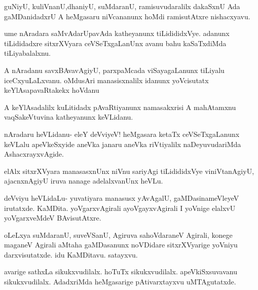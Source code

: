 \documentclass{article}
\begin{document}
\begin{mng}%
guNiyU, kuliVnanU,dhaniyU, suMdaranU, ramisuvudaralilx
dakaSxnU Ada gaMDanidadxrU A heMgasaru niVcananunx hoMdi ramisutAtxre
nishacxyavu.
\end{mng}

\begin{mng}%
ume nAradara saMvAdarUpavAda katheyanunx tiLidididxVye.
adanunx tiLididadxre sitxrXVyara ceVSeTxgaLanUnx avanu bahu kaSaTxdiMda tiLiyabalalxnu.
\end{mng}

\begin{mng}%
A nAradanu savxBAvavAgiyU, parxpaMcada viSayagaLanunx tiLiyalu
iceCxyuLaLxvanu. oMdusAri manasisxnalilx idanunx yoVcisutatx
keYlAsapavaRtakekx hoVdanu
\end{mng}

\begin{mng}%
A keYlAsadalilx kuLitidadx pAvaRtiyanunx namasakxrisi A mahAtamxnu
vaqSakeVtuvina katheyanunx keVLidanu.
\end{mng}

\begin{mng}%
nAradaru heVLidanu- eleY deVviyeV! heMgasara ketaTx ceVSeTxgaLanunx
keVLalu apeVkeSxyide aneVka janaru aneVka riVtiyalilx naDeyuvudariMda 
AshacxrayxvAgide.
\end{mng}

\begin{mng}%
elAlx sitxrXVyara manasasxnUnx niVnu sariyAgi tiLidididxVye
viniVtanAgiyU, ajacnxnAgiyU iruva nanage adelalxvanUnx heVLu.
\end{mng}

\begin{mng}%
deVviyu heVLidaLu- yuvatiyara manasusx yAvAgalU,
gaMDasinameVleyeV irutatxde. KaMDita. yoVgarxvAgirali ayoVgayxvAgirali
I yoVnige elalxvU yoVgarxveMdeV BAvisutAtxre.
\end{mng}

\begin{mng}%
oLeLxya suMdaranU, suveVSanU, Agiruva sahoVdaraneV
Agirali, konege maganeV Agirali aMtaha gaMDasanunx noVDidare sitxrXVyarige
yoVniyu darxvisutatxde. idu KaMDitavu. satayxvu.
\end{mng}

\begin{mng}%
avarige sathxLa sikukxvudilalx. hoTuTx sikukxvudilalx. apeVkiSxsuvavanu 
sikukxvudilalx. AdadxriMda heMgasarige pAtivarxtayxvu uMTAgutatxde.
\end{mng}
\end{document}

